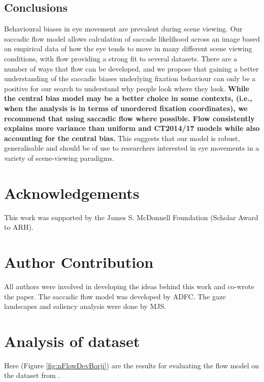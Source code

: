 \documentclass[a4paper, twocolumn, oneside, 11pt]{article}
\begin{document}
\subsection{Conclusions}
Behavioural biases in eye movement are prevalent during scene viewing. Our saccadic flow model allows calculation of saccade likelihood across an image based on empirical data of how the eye tends to move in many different scene viewing conditions, with flow providing a strong fit to several datasets. There are a number of ways that flow can be developed, and we propose that gaining a better understanding of the saccadic biases underlying fixation behaviour can only be a positive for our search to understand why people look where they look. \textbf{While the central bias model may be a better choice in some contexts, (i.e., when the analysis is in terms of unordered fixation coordinates), we recommend that using saccadic flow where possible. Flow consistently explains more variance than uniform and CT2014/17 models while also accounting for the central bias.} This suggests that our model is robust, generalisable and should be of use to researchers interested in eye movements in a variety of scene-viewing paradigms. 


\section*{Acknowledgements}

This work was supported by the James S. McDonnell Foundation (Scholar Award to ARH).

\section*{Author Contribution}

All authors were involved in developing the ideas behind this work and co-wrote the paper. The saccadic flow model was developed by ADFC. The gaze landscapes and saliency analysis were done by MJS.

\appendix



\section{Analysis of \cite{borji2015} dataset}

Here (Figure \ref{fig:nFlowDevBorji}) are the results for evaluating the flow model on the dataset from \cite{borji2015}.
\end{document}
